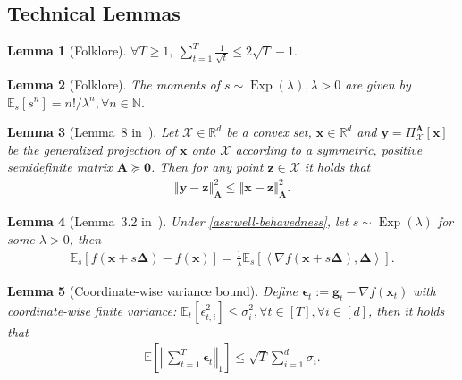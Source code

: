 \documentclass{article}
\newtheorem{lem}{Lemma}
\def \y {\mathbf{y}}
\def \E {\mathbb{E}}
\def \x {\mathbf{x}}
\def \g {\mathbf{g}}
\def \z {\mathbf{z}}
\def \R {\mathbb{R}}
\def \Ab {\mathbf{A}}
\def \X {\mathcal{X}}
\def \N {\mathbb{N}}
\newcommand{\inner}[2]{\left\langle #1, #2 \right\rangle}
\DeclareMathOperator*{\expdist}{Exp}
\newcommand{\norm}[1]{\left\Vert#1\right\Vert}
\def \eps {\bm{\epsilon}}
\def \bDelta {\bm{\Delta}}
\newcommand{\sqbrac}[1]{\left[#1\right]}
\def\0{\bm{0}}
\begin{document}
\subsection{Technical Lemmas}

\begin{lem}[Folklore]\label{lem:sqrt-sum}
$\forall T\ge1,\ \sum_{t=1}^T\frac{1}{\sqrt{t}}\le2\sqrt{T}-1.$
\end{lem}

\begin{lem}[Folklore]\label{lem:exp-moments}
The moments of $s\sim\expdist(\lambda),\lambda>0$ are given by $\E_s[s^n]=n!/\lambda^n,\forall n\in\N$.
\end{lem}

\begin{lem}[Lemma~8 in~\citet{hazan2007logarithmic}]\label{lem:projection}
    Let $\X\in\R^d$ be a convex set, $\x\in\R^d$ and $\y=\Pi_\X^\Ab[\x]$ be the generalized projection of $\x$ onto $\X$ according to a symmetric, positive semidefinite matrix $\Ab\succeq\0$. Then for any point $\z\in\X$ it holds that
    \begin{align*}
        \norm{\y-\z}_\Ab^2\le \norm{\x-\z}_\Ab^2.
    \end{align*}
\end{lem}

\begin{lem}[Lemma~3.2 in~\citet{zhang2024random}]\label{lem:random-taylor-expansion}
    Under \cref{ass:well-behavedness}, let $s\sim\expdist(\lambda)$ for some $\lambda>0$, then 
    \begin{align*}
        \E_s\sqbrac{f(\x+s\bDelta)-f(\x)}=\frac{1}{\lambda}\E_s\sqbrac{\inner{\nabla f(\x+s\bDelta)}{\bDelta}}.
    \end{align*}
\end{lem}

\begin{lem}[Coordinate-wise variance bound]\label{lem:coordinate-variance}
    Define $\eps_t:=\g_t-\nabla f(\x_t)$ with coordinate-wise finite variance: $\E_t[\epsilon_{t,i}^2]\le\sigma_i^2,\forall t\in[T],\forall i\in[d]$, then it holds that
    \begin{align*}
        \E\sqbrac{\norm{\sum_{t=1}^T\eps_t}_1}\le\sqrt{T}\sum_{i=1}^d\sigma_i.
    \end{align*}
\end{lem}
\end{document}
